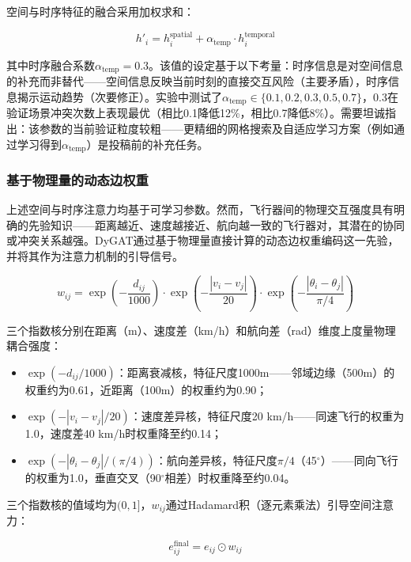 \documentclass[12pt,a4paper,UTF8]{ctexart}
\begin{document}
空间与时序特征的融合采用加权求和：

\begin{equation}
    h'_i = h_i^{\text{spatial}} + \alpha_{\text{temp}} \cdot h_i^{\text{temporal}}
\end{equation}

其中时序融合系数$\alpha_{\text{temp}} = 0.3$。该值的设定基于以下考量：时序信息是对空间信息的补充而非替代——空间信息反映当前时刻的直接交互风险（主要矛盾），时序信息揭示运动趋势（次要修正）。实验中测试了$\alpha_{\text{temp}} \in \{0.1, 0.2, 0.3, 0.5, 0.7\}$，0.3在验证场景冲突次数上表现最优（相比0.1降低12\%，相比0.7降低8\%）。需要坦诚指出：该参数的当前验证粒度较粗——更精细的网格搜索及自适应学习方案（例如通过学习得到$\alpha_{\text{temp}}$）是投稿前的补充任务。

\subsubsection{基于物理量的动态边权重}

上述空间与时序注意力均基于可学习参数。然而，飞行器间的物理交互强度具有明确的先验知识——距离越近、速度越接近、航向越一致的飞行器对，其潜在的协同或冲突关系越强。DyGAT通过基于物理量直接计算的动态边权重编码这一先验，并将其作为注意力机制的引导信号。

\begin{equation}
    w_{ij} = \exp\left(-\frac{d_{ij}}{1000}\right) \cdot \exp\left(-\frac{|v_i - v_j|}{20}\right) \cdot \exp\left(-\frac{|\theta_i - \theta_j|}{\pi/4}\right)
\end{equation}

三个指数核分别在距离（m）、速度差（km/h）和航向差（rad）维度上度量物理耦合强度：
\begin{itemize}
    \item $\exp(-d_{ij}/1000)$：距离衰减核，特征尺度1000m——邻域边缘（500m）的权重约为0.61，近距离（100m）的权重约为0.90；
    \item $\exp(-|v_i - v_j|/20)$：速度差异核，特征尺度20 km/h——同速飞行的权重为1.0，速度差40 km/h时权重降至约0.14；
    \item $\exp(-|\theta_i - \theta_j|/(\pi/4))$：航向差异核，特征尺度$\pi/4$（45$^\circ$）——同向飞行的权重为1.0，垂直交叉（90$^\circ$相差）时权重降至约0.04。
\end{itemize}

三个指数核的值域均为$(0, 1]$，$w_{ij}$通过Hadamard积（逐元素乘法）引导空间注意力：

\begin{equation}
    e_{ij}^{\text{final}} = e_{ij} \odot w_{ij}
\end{equation}
\end{document}
